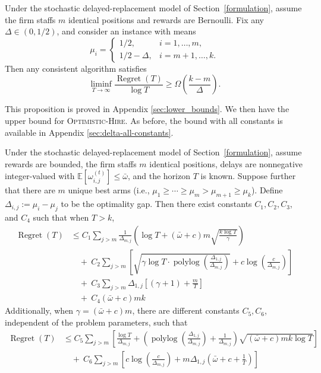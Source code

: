 \documentclass[opre,blindrev]{informs3}
\newcommand{\polylog}{\operatorname{polylog}}
\newcommand{\Regret}{\operatorname{Regret}}
\begin{document}
\begin{proposition}\label{prop:asymptoptic-lower}
    Under the stochastic delayed-replacement model of Section~\ref{formulation}, assume the firm staffs \(m\) identical positions and rewards are Bernoulli. Fix any \(\Delta \in (0,1/2)\), and consider an instance with means
    \[\mu_i =\begin{cases}
        1/2, & i = 1,\dots,m,\\
        1/2-\Delta, & i = m+1,\dots,k.
    \end{cases}\]
    Then any consistent algorithm satisfies
    \[
        \liminf_{T\to\infty}\frac{\Regret(T)}{\log T}\geq \Omega\left(\frac{k-m}{\Delta}\right).
    \]
\end{proposition}
This proposition is proved in Appendix \ref{sec:lower_bounds}. We then have the upper bound for \textsc{Optimistic-Hire}. As before, the bound with all constants is available in Appendix \ref{sec:delta-all-constants}.
\begin{theorem}\label{thm:delta-main}
    Under the stochastic delayed-replacement model of Section~\ref{formulation}, assume rewards are bounded, the firm staffs \(m\) identical positions, delays are nonnegative integer-valued with \(\mathbb E[\omega_{i,j}^{(t)}]\le \bar{\omega}\), and the horizon \(T\) is known. Suppose further that there are \(m\) unique best arms (i.e., \(\mu_1\geq \cdots \geq \mu_m >\mu_{m+1}\geq \mu_k\)). Define \(\Delta_{i,j}:=\mu_i-\mu_j\) to be the optimality gap. Then there exist constants \(C_1,C_2,C_3\), and \(C_4\) such that when \(T>k\),
    \begin{align*}
        \Regret(T)&\leq C_1\sum_{j>m}\frac{1}{\Delta_{m,j}} \left( \log T+(\bar{\omega}+c)m\sqrt{\frac{k\log T}{\gamma }}\right)\\
        &\quad +~ C_2\sum_{j>m} \left[\sqrt{\gamma \log T\cdot \polylog\left(\frac{\Delta_{1,j}}{\Delta_{m,j}}\right)}+c\log\left(\frac{c}{\Delta_{m,j}}\right)\right]\\
        & \quad + ~C_3\sum_{j>m} \Delta_{1,j} \left[(\gamma + 1) + \frac{m}{T}\right]\\
        &\quad +~C_4(\bar{\omega}+c)mk
    \end{align*}
    Additionally, when \(\gamma=(\bar{\omega}+c)m\), there are different constants \(C_5, C_6\), independent of the problem parameters, such that
    \begin{align*}
        \Regret(T)&\leq C_5\sum_{j>m}\left[\frac{\log T}{\Delta_{m,j}}+\left(\polylog\left(\frac{\Delta_{1,j}}{\Delta_{m,j}}\right)+\frac{1}{\Delta_{m,j}}\right)\sqrt{(\bar{\omega}+c)mk\log T}\right]\ \\
        &\quad +~ C_6\sum_{j>m} \left[c\log\left(\frac{c}{\Delta_{m,j}}\right)+m\Delta_{1,j} \left(\bar{\omega}+c + \frac{1}{T}\right)\right]
    \end{align*}
\end{theorem}
\end{document}
